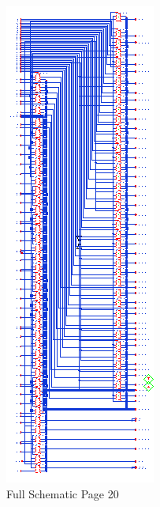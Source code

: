 \documentclass[11pt]{article}
\begin{document}
		
		\begin{figure}[H] 
			\centering 
			\includegraphics[width=\textwidth,height=\dimexpr\textheight-4\baselineskip-\abovecaptionskip-\belowcaptionskip\relax,keepaspectratio]{"Pictures/Full Schematic Page 20"}
			\caption{Full Schematic Page 20} 
			\label{fig:Full-Schematic-Page-20} 
		\end{figure}
		
\end{document}
